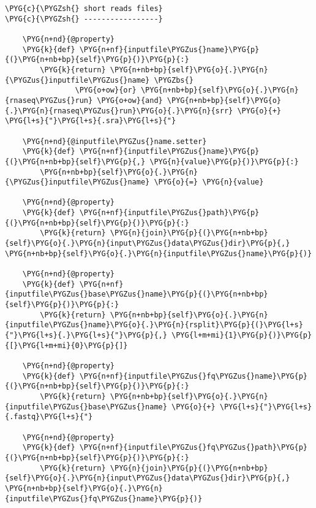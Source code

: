 \begin{Verbatim}[commandchars=\\\{\}]
\PYG{c}{\PYGZsh{} short reads files}
\PYG{c}{\PYGZsh{} -----------------}

    \PYG{n+nd}{@property}
    \PYG{k}{def} \PYG{n+nf}{inputfile\PYGZus{}name}\PYG{p}{(}\PYG{n+nb+bp}{self}\PYG{p}{)}\PYG{p}{:}
        \PYG{k}{return} \PYG{n+nb+bp}{self}\PYG{o}{.}\PYG{n}{\PYGZus{}inputfile\PYGZus{}name} \PYGZbs{}
                \PYG{o+ow}{or} \PYG{n+nb+bp}{self}\PYG{o}{.}\PYG{n}{rnaseq\PYGZus{}run} \PYG{o+ow}{and} \PYG{n+nb+bp}{self}\PYG{o}{.}\PYG{n}{rnaseq\PYGZus{}run}\PYG{o}{.}\PYG{n}{srr} \PYG{o}{+} \PYG{l+s}{"}\PYG{l+s}{.sra}\PYG{l+s}{"}

    \PYG{n+nd}{@inputfile\PYGZus{}name.setter}
    \PYG{k}{def} \PYG{n+nf}{inputfile\PYGZus{}name}\PYG{p}{(}\PYG{n+nb+bp}{self}\PYG{p}{,} \PYG{n}{value}\PYG{p}{)}\PYG{p}{:}
        \PYG{n+nb+bp}{self}\PYG{o}{.}\PYG{n}{\PYGZus{}inputfile\PYGZus{}name} \PYG{o}{=} \PYG{n}{value}

    \PYG{n+nd}{@property}
    \PYG{k}{def} \PYG{n+nf}{inputfile\PYGZus{}path}\PYG{p}{(}\PYG{n+nb+bp}{self}\PYG{p}{)}\PYG{p}{:}
        \PYG{k}{return} \PYG{n}{join}\PYG{p}{(}\PYG{n+nb+bp}{self}\PYG{o}{.}\PYG{n}{input\PYGZus{}data\PYGZus{}dir}\PYG{p}{,} \PYG{n+nb+bp}{self}\PYG{o}{.}\PYG{n}{inputfile\PYGZus{}name}\PYG{p}{)}

    \PYG{n+nd}{@property}
    \PYG{k}{def} \PYG{n+nf}{inputfile\PYGZus{}base\PYGZus{}name}\PYG{p}{(}\PYG{n+nb+bp}{self}\PYG{p}{)}\PYG{p}{:}
        \PYG{k}{return} \PYG{n+nb+bp}{self}\PYG{o}{.}\PYG{n}{inputfile\PYGZus{}name}\PYG{o}{.}\PYG{n}{rsplit}\PYG{p}{(}\PYG{l+s}{"}\PYG{l+s}{.}\PYG{l+s}{"}\PYG{p}{,} \PYG{l+m+mi}{1}\PYG{p}{)}\PYG{p}{[}\PYG{l+m+mi}{0}\PYG{p}{]}

    \PYG{n+nd}{@property}
    \PYG{k}{def} \PYG{n+nf}{inputfile\PYGZus{}fq\PYGZus{}name}\PYG{p}{(}\PYG{n+nb+bp}{self}\PYG{p}{)}\PYG{p}{:}
        \PYG{k}{return} \PYG{n+nb+bp}{self}\PYG{o}{.}\PYG{n}{inputfile\PYGZus{}base\PYGZus{}name} \PYG{o}{+} \PYG{l+s}{"}\PYG{l+s}{.fastq}\PYG{l+s}{"}

    \PYG{n+nd}{@property}
    \PYG{k}{def} \PYG{n+nf}{inputfile\PYGZus{}fq\PYGZus{}path}\PYG{p}{(}\PYG{n+nb+bp}{self}\PYG{p}{)}\PYG{p}{:}
        \PYG{k}{return} \PYG{n}{join}\PYG{p}{(}\PYG{n+nb+bp}{self}\PYG{o}{.}\PYG{n}{input\PYGZus{}data\PYGZus{}dir}\PYG{p}{,} \PYG{n+nb+bp}{self}\PYG{o}{.}\PYG{n}{inputfile\PYGZus{}fq\PYGZus{}name}\PYG{p}{)}


\end{Verbatim}
